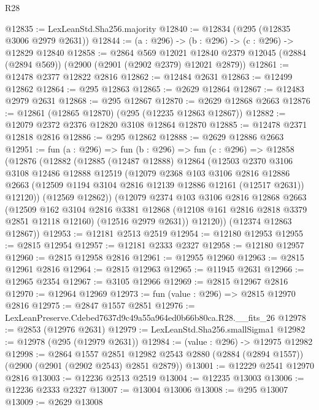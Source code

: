 \begin{lexlean}{R28}
\begin{coremodule}
@12835 := LexLeanStd.Sha256.majority
@12840 := @12834 (@295 (@12835 @3006 @2979 @2631))
@12844 := (a : @296) -> (b : @296) -> (c : @296) -> @12829 @12840
@12858 := @2864
    @569
    @12021
    @12840
    @2379
    @12045
    (@2884 (@2894 @569))
    (@2900 (@2901 (@2902 @2379) @12021 @2879))
@12861 := @12478 @2377 @12822 @2816
@12862 := @12484 @2631
@12863 := @12499 @12862
@12864 := @295 @12863
@12865 := @2629 @12864
@12867 := @12483 @2979 @2631
@12868 := @295 @12867
@12870 := @2629 @12868 @2663
@12876 := @12861 (@12865 @12870) (@295 (@12235 @12863 @12867))
@12882 := @12079 @2372 @2376 @12820 @3108 @12864 @12870
@12885 := @12478 @2371 @12818 @2816
@12886 := @295 @12862
@12888 := @2629 @12886 @2663
@12951 := fun (a : @296) =>
  fun (b : @296) =>
  fun (c : @296) =>
  @12858
    (@12876
      (@12882
        (@12885
          (@12487 @12888)
          @12864
          (@12503
            @2370
            @3106
            @3108
            @12486
            @12888
            @12519
            (@12079
              @2368
              @103
              @3106
              @2816
              @12886
              @2663
              (@12509 @1194 @3104 @2816 @12139 @12886 @12161 (@12517 @2631))
              @12120))
          (@12569 @12862))
        (@12079
          @2374
          @103
          @3106
          @2816
          @12868
          @2663
          (@12509
            @162
            @3104
            @2816
            @3381
            @12868
            (@12108 @161 @2816 @2818 @3379 @2851 @12118 @12160)
            (@12516 @2979 @2631))
          @12120))
      (@12374 @12863 @12867))
@12953 := @12181 @2513 @2519
@12954 := @12180 @12953
@12955 := @2815 @12954
@12957 := @12181 @2333 @2327
@12958 := @12180 @12957
@12960 := @2815 @12958 @2816
@12961 := @12955 @12960
@12963 := @2815 @12961 @2816
@12964 := @2815 @12963
@12965 := @11945 @2631
@12966 := @12965 @2354
@12967 := @3105 @12966
@12969 := @2815 @12967 @2816
@12970 := @12964 @12969
@12973 := fun (value : @296) => @2815 @12970 @2816
@12975 := @2847 @1557 @2851
@12976 := LexLeanPreserve.Cdebed7637d9c49a55a964ed0b66b80ca.R28.__fits_26
@12978 := @2853 (@12976 @2631)
@12979 := LexLeanStd.Sha256.smallSigma1
@12982 := @12978 (@295 (@12979 @2631))
@12984 := (value : @296) -> @12975 @12982
@12998 := @2864
    @1557
    @2851
    @12982
    @2543
    @2880
    (@2884 (@2894 @1557))
    (@2900 (@2901 (@2902 @2543) @2851 @2879))
@13001 := @12229 @2541 @12970 @2816
@13003 := @12236 @2513 @2519
@13004 := @12235 @13003
@13006 := @12236 @2333 @2327
@13007 := @13004 @13006
@13008 := @295 @13007
@13009 := @2629 @13008

\end{coremodule}
\end{lexlean}

